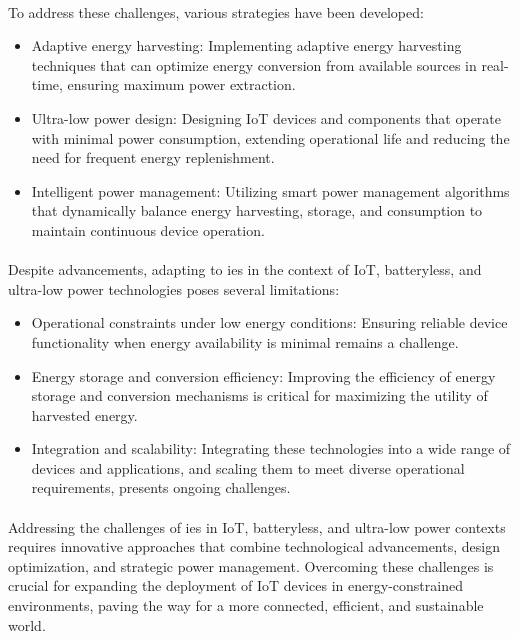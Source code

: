     \paragraph{}
    To address these challenges, various strategies have been developed:
    \begin{itemize}
        \item Adaptive energy harvesting: Implementing adaptive energy harvesting techniques that can optimize energy conversion from available sources in real-time, ensuring maximum power extraction.
        \item Ultra-low power design: Designing IoT devices and components that operate with minimal power consumption, extending operational life and reducing the need for frequent energy replenishment.
        \item Intelligent power management: Utilizing smart power management algorithms that dynamically balance energy harvesting, storage, and consumption to maintain continuous device operation.
    \end{itemize}

    \paragraph{}
    Despite advancements, adapting to \gls{ies} in the context of IoT, batteryless, and ultra-low power technologies poses several limitations:
    \begin{itemize}
        \item Operational constraints under low energy conditions: Ensuring reliable device functionality when energy availability is minimal remains a challenge.
        \item Energy storage and conversion efficiency: Improving the efficiency of energy storage and conversion mechanisms is critical for maximizing the utility of harvested energy.
        \item Integration and scalability: Integrating these technologies into a wide range of devices and applications, and scaling them to meet diverse operational requirements, presents ongoing challenges.
    \end{itemize}
    
    \paragraph{}
    Addressing the challenges of \gls{ies} in IoT, batteryless, and ultra-low power contexts requires innovative approaches that combine technological advancements, design optimization, and strategic power management. Overcoming these challenges is crucial for expanding the deployment of IoT devices in energy-constrained environments, paving the way for a more connected, efficient, and sustainable world.


